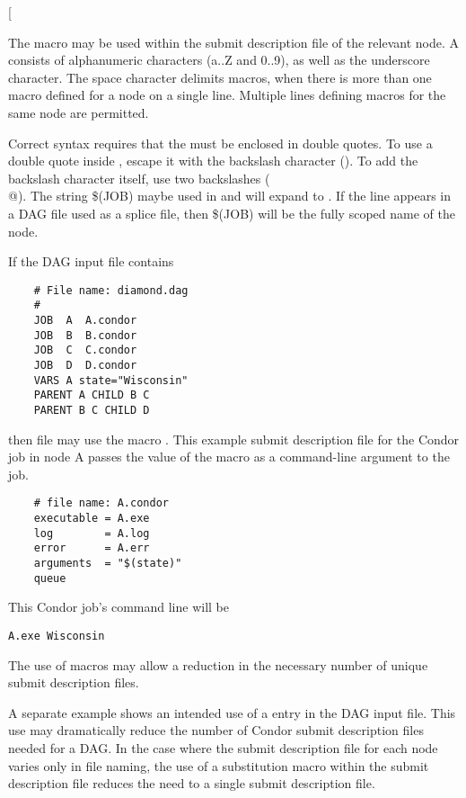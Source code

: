    [\Arg{"string"\Dots]}

The macro may be used within the
submit description file of the relevant node.  A 
consists of alphanumeric characters (a..Z and 0..9),
as well as the underscore character.
The space character delimits macros,
when there is more than one macro defined for a node on a single line.
Multiple lines defining macros for the same node are permitted.

Correct syntax requires that the  must be
enclosed in double quotes.
To use a double quote inside ,
escape it with the backslash character (\verb@\@).
To add the backslash character itself, use two backslashes (\verb@\\@).
The string \$(JOB) maybe used in  and will expand to
. 
If the  line appears in a DAG file used as a splice file, 
then \$(JOB) will be the fully scoped name of the node.


If the DAG input file contains
\footnotesize
\begin{verbatim}
    # File name: diamond.dag
    #
    JOB  A  A.condor 
    JOB  B  B.condor 
    JOB  C  C.condor	
    JOB  D  D.condor
    VARS A state="Wisconsin"
    PARENT A CHILD B C
    PARENT B C CHILD D

\end{verbatim}
\normalsize

then file  may use the macro \verb@state@.
This example submit description file for the Condor
job in node A passes the value
of the macro as a command-line argument to the job.

\footnotesize
\begin{verbatim}
    # file name: A.condor
    executable = A.exe
    log        = A.log
    error      = A.err
    arguments  = "$(state)"
    queue
\end{verbatim}
\normalsize

This Condor job's command line will be
\footnotesize
\begin{verbatim}
A.exe Wisconsin
\end{verbatim}
\normalsize
The use of macros may allow a reduction in the necessary number 
of unique submit description files.

A separate example shows an intended use of a  entry
in the DAG input file.
This use may dramatically reduce the number of Condor submit description
files needed for a DAG.
In the case where the submit description file for each node
varies only in file naming, the use of a substitution macro
within the submit description file reduces the need to
a single submit description file.

